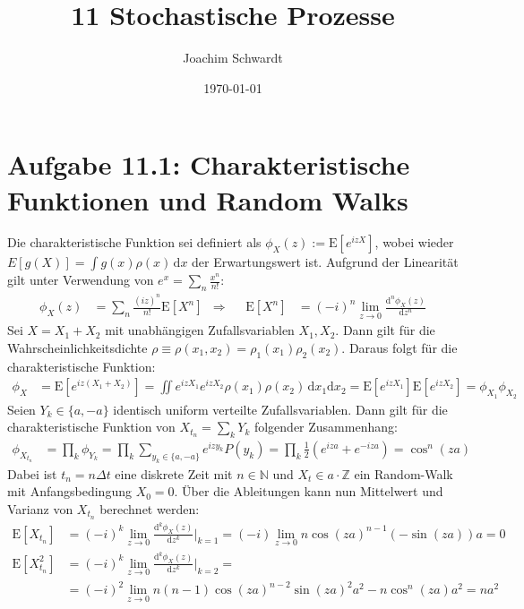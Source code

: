 \documentclass[a4paper,12pt]{article}
\newcommand{\kla}{}
\newcommand{\klam}{}
\newcommand{\tecxt}{}
\begin{document}
\title{11 Stochastische Prozesse}
\author{Joachim Schwardt}
\date{\today}
\maketitle

\section*{Aufgabe 11.1: Charakteristische Funktionen und Random Walks}
Die charakteristische Funktion sei definiert als $\phi_X(z):=\tecxt\text{E}\klam\left[ {e^{izX}} \right]$, wobei wieder $E[g(X)]=\int g(x)\rho(x)\,\mathrm{d}x$ der Erwartungswert ist. Aufgrund der Linearität gilt unter Verwendung von $e^x=\sum_n\frac{x^n}{n!}$:
\begin{align*}
\phi_X(z)&=\sum_n\frac{(iz)^n}{n!}\tecxt\text{E}\klam\left[ {X^n} \right]&\Rightarrow &&\tecxt\text{E}\klam\left[ {X^n} \right]&=(-i)^n\lim_{z\rightarrow 0}\frac{\tecxt\text{d}^n\phi_X(z)}{\tecxt\text{d}z^n}
\end{align*}
Sei $X=X_1+X_2$ mit unabhängigen Zufallsvariablen $X_1,X_2$. Dann gilt für die Wahrscheinlichkeitsdichte $\rho\equiv\rho(x_1,x_2)=\rho_1(x_1)\rho_2(x_2)$. Daraus folgt für die charakteristische Funktion:
\begin{align*}
\phi_X&=\tecxt\text{E}\klam\left[ {e^{iz(X_1+X_2)}} \right]=\iint e^{izX_1}e^{izX_2}\rho(x_1)\rho(x_2)\,\mathrm{d}x_1\mathrm{d}x_2=\tecxt\text{E}\klam\left[ {e^{izX_1}} \right]\tecxt\text{E}\klam\left[ {e^{izX_2}} \right]=\phi_{X_1}\phi_{X_2}
\end{align*}
Seien $Y_k\in\{a,-a\}$ identisch uniform verteilte Zufallsvariablen. Dann gilt für die charakteristische Funktion von $X_{t_n}=\sum_kY_k$ folgender Zusammenhang:
\begin{align*}
\phi_{X_{t_n}}&=\prod_k\phi_{Y_k}=\prod_k\sum_{y_k\in\{a,-a\}}e^{izy_k}P(y_k)=\prod_k \frac{1}{2}\kla\left( {e^{iza}+e^{-iza}} \right)=\cos^n(za)
\end{align*}
Dabei ist $t_n=n\Delta t$ eine diskrete Zeit mit $n\in\mathbb{N}$ und $X_t\in a\cdot\mathbb{Z}$ ein Random-Walk mit Anfangsbedingung $X_0=0$. Über die Ableitungen kann nun Mittelwert und Varianz von $X_{t_n}$ berechnet werden:
\begin{align*}
\tecxt\text{E}\klam\left[ {X_{t_n}} \right]&=(-i)^k\lim_{z\rightarrow 0}\frac{\tecxt\text{d}^k\phi_X(z)}{\tecxt\text{d}z^k}\bigg\vert_{k=1}=(-i)\lim_{z\rightarrow 0}n\cos(za)^{n-1}\kla\left( {-\sin(za)} \right) a=0\\
\tecxt\text{E}\klam\left[ {X_{t_n}^2} \right]&=(-i)^k\lim_{z\rightarrow 0}\frac{\tecxt\text{d}^k\phi_X(z)}{\tecxt\text{d}z^k}\bigg\vert_{k=2}=\\
&=(-i)^2\lim_{z\rightarrow 0}n(n-1)\cos(za)^{n-2}\sin(za)^2a^2-n\cos^n(za)a^2=na^2
\end{align*}
\end{document}

